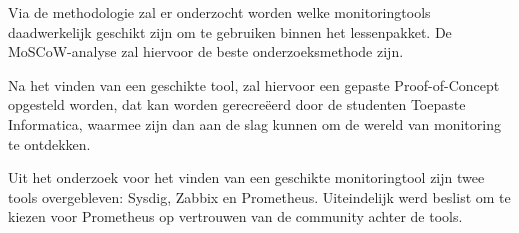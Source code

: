 Via de methodologie zal er onderzocht worden welke monitoringtools daadwerkelijk geschikt zijn om te gebruiken binnen het lessenpakket. De MoSCoW-analyse zal hiervoor de beste onderzoeksmethode zijn. 

Na het vinden van een geschikte tool, zal hiervoor een gepaste Proof-of-Concept opgesteld worden, dat kan worden gerecreëerd door de studenten Toepaste Informatica, waarmee zijn dan aan de slag kunnen om de wereld van monitoring te ontdekken. 

Uit het onderzoek voor het vinden van een geschikte monitoringtool zijn twee tools overgebleven: Sysdig, Zabbix en Prometheus. Uiteindelijk werd beslist om te kiezen voor Prometheus op vertrouwen van de community achter de tools. 